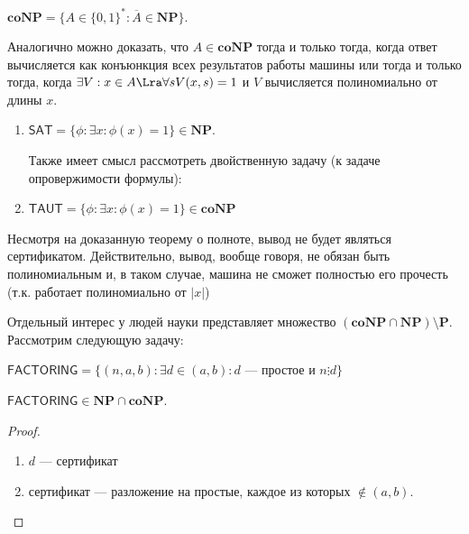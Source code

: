 \begin{definition}
    \(\mathbf{coNP} = \{A \in \{0, 1\}^*: \overline{A} \in \mathbf{NP}\}\).
\end{definition}

\begin{note}
    Аналогично можно доказать, что \(A \in \mathbf{coNP}\) тогда и только тогда, когда ответ вычисляется как конъюнкция всех результатов работы машины или тогда и только тогда, когда \(\exists V: x \in A \Lra \forall s V(x, s) = 1\) и \(V\) вычисляется полиномиально от длины \(x\).
\end{note}

\begin{example}
    \begin{enumerate}
        \item \(\mathsf{SAT} = \{\phi: \exists x: \phi(x) = 1\} \in \mathbf{NP}\).
        
        Также имеет смысл рассмотреть двойственную задачу (к задаче опровержимости формулы):
        \item \(\mathsf{TAUT} = \{\phi: \exists x: \phi(x) = 1\} \in \mathbf{coNP}\)
    \end{enumerate}
\end{example}

\begin{note}
    Несмотря на доказанную теорему о полноте, вывод не будет являться сертификатом. Действительно, вывод, вообще говоря, не обязан быть полиномиальным и, в таком случае, машина не сможет полностью его прочесть (т.к. работает полиномиально от \(|x|\))
\end{note}

Отдельный интерес у людей науки представляет множество \((\mathbf{coNP} \cap \mathbf{NP}) \setminus \mathbf{P}\). Рассмотрим следующую задачу:

\begin{definition}
    \(\mathsf{FACTORING} = \{(n, a, b): \exists d \in (a, b): d\text{ --- простое и }n \vdots d\}\)
\end{definition}

\begin{proposition}
    \(\mathsf{FACTORING} \in \mathbf{NP} \cap \mathbf{coNP}\).
\end{proposition}
\begin{proof}\indent
    \begin{enumerate}
        \item[\(\in \mathbf{NP}\)] \(d\) --- сертификат
        \item[\(\in \mathbf{coNP}\)] сертификат --- разложение на простые, каждое из которых \(\notin (a, b)\).
    \end{enumerate}
\end{proof}

